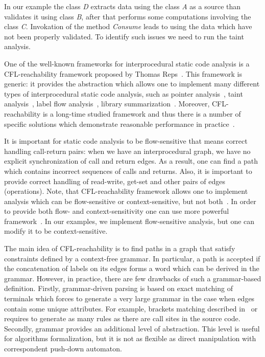 In our example the class \textit{D} extracts data using the class \textit{A} as a source than validates it using class \textit{B}, after that performs some computations involving the class \textit{C}.
Invokation of the method \textit{Consume} leads to using the data which have not been properly validated.
To identify such issues we need to run the taint analysis.

One of the well-known frameworks for interprocedural static code analysis is a CFL-reachability framework proposed by Thomas Reps~\cite{Reps}.
This framework is generic: it provides the abstraction which allows one to implement many different types of interprocedural static code analysis, such as pointer analysis~\cite{Zheng, JavaCFL}, taint analysis~\cite{Huang:2015:SPT:2771783.2771803}, label flow analysis~\cite{10.1007/11823230_7,CFLr}, library summarization~\cite{10.1007/978-3-662-54434-1_33}.
Moreover, CFL-reachability is a long-time studied framework and thus there is a number of specific solutions which demonstrate reasonable performance in practice~\cite{Wang:2017:GSD:3093315.3037744}.

It is important for static code analysis to be flow-sensitive that means correct handling call-return pairs: when we have an interprocedural graph, we have no explicit synchronization of call and return edges.
As a result, one can find a path which contains incorrect sequences of calls and returns.
Also, it is important to provide correct handling of read-write, get-set and other pairs of edges (operations).
Note, that CFL-reachability framework allows one to implement analysis which can be flow-sensitive or context-sensitive, but not both~\cite{Reps:2000:UCD:345099.345137}.
In order to provide both flow- and context-sensitivity one can use more powerful framework~\cite{Zhang:2017:CDA:3093333.3009848}.
In our examples, we implement flow-sensitive analysis, but one can modify it to be context-sensitive.

The main idea of CFL-reachability is to find paths in a graph that satisfy constraints defined by a context-free grammar.
In particular, a path is accepted if the concatenation of labels on its edges forms a word which can be derived in the grammar.
However, in practice, there are few drawbacks of such a grammar-based definition.
Firstly, grammar-driven parsing is based on exact matching of terminals which forces to generate a very large grammar in the case when edges contain some unique attributes.
For example, brackets matching described in~\cite{CFLr} or~\cite{Zheng, JavaCFL} requires to generate as many rules as there are call sites in the source code.
Secondly, grammar provides an additional level of abstraction.
This level is useful for algorithms formalization, but it is not as flexible as direct manipulation with correspondent push-down automaton.

